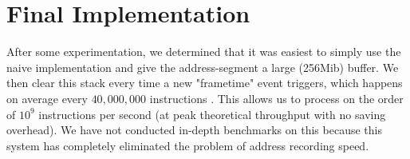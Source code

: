 \section{Final Implementation}
After some experimentation, we determined that it was easiest to simply use the naive implementation and give the address-segment a large (256Mib) buffer. We then clear this stack every time a new "frametime" event triggers, which happens on average every $40,000,000$ instructions \cite[Scheduler.h:72]{librr-src}. This allows us to process on the order of $10^9$ instructions per second (at peak theoretical throughput with no saving overhead). We have not conducted in-depth benchmarks on this because this system has completely eliminated the problem of address recording speed. 

